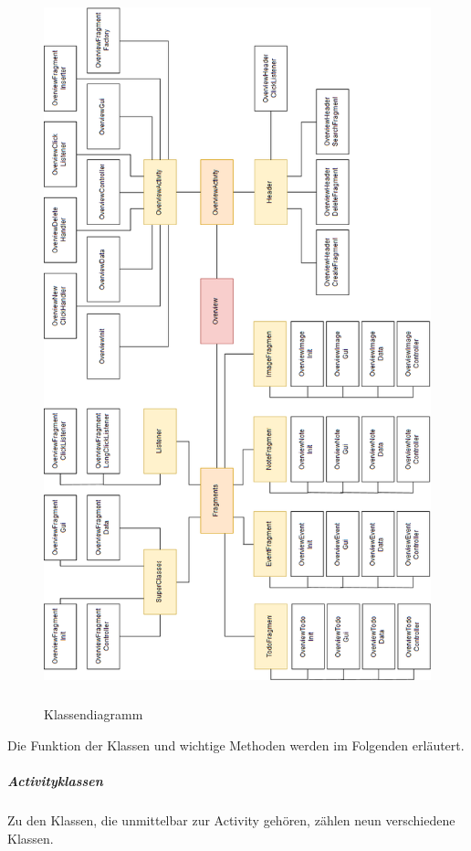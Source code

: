 \begin{figure}[H]
\centering
\begin{minipage}[t]{1\textwidth} %
\caption{Klassendiagramm} %
\includegraphics[height=20cm]{img/Klassendiagramm_lite}\\ %
\end{minipage}
\end{figure}

Die Funktion der Klassen und wichtige Methoden werden im Folgenden erläutert.

\subparagraph{Activityklassen}

Zu den Klassen, die unmittelbar zur Activity gehören, zählen neun verschiedene Klassen.

